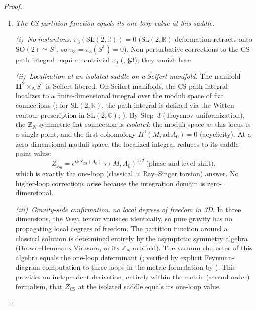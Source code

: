 \begin{proof}
\begin{enumerate}
\item[\emph{5b.}] \emph{The CS partition function equals its
  one-loop value at this saddle.}

  \emph{(i)~No instantons.}
  $\pi_3(\mathrm{SL}(2,\mathbb{R})) = 0$
  ($\mathrm{SL}(2,\mathbb{R})$ deformation-retracts
  onto $\mathrm{SO}(2) \simeq S^1$, so
  $\pi_3 = \pi_3(S^1) = 0$).
  Non-perturbative corrections to the CS path integral
  require nontrivial $\pi_3$
  (\citealt{Witten1989Jones}, \S3);
  they vanish here.

  \emph{(ii)~Localization at an isolated saddle on a
  Seifert manifold.}
  The manifold $\mathbf{H}^2 \times_N S^1$ is Seifert
  fibered.  On Seifert manifolds, the CS path integral
  localizes to a finite-dimensional integral over the
  moduli space of flat connections
  (\citealt{BeasleyWitten2005}; for $\mathrm{SL}(2,\mathbb{R})$,
  the path integral is defined via the Witten contour
  prescription in $\mathrm{SL}(2,\mathbb{C})$;
  \citealt{Witten2010analytic}).
  By Step~3 (Troyanov uniformization), the
  $\mathbb{Z}_N$-symmetric flat connection is
  \emph{isolated}: the moduli space at this locus is
  a single point, and the first cohomology
  $H^1(M;\mathrm{ad}\,A_0) = 0$ (acyclicity).
  At a zero-dimensional moduli space, the
  localized integral reduces to its saddle-point value:
  \[
    Z_{A_0} = e^{ik\,S_{\mathrm{CS}}(A_0)}
    \;\tau(M, A_0)^{1/2}
    \;\text{(phase and level shift)},
  \]
  which is exactly the one-loop (classical $\times$
  Ray--Singer torsion) answer.  No higher-loop
  corrections arise because the integration domain is
  zero-dimensional.

  \emph{(iii)~Gravity-side confirmation: no local
  degrees of freedom in 3D.}
  In three dimensions, the Weyl tensor vanishes
  identically, so pure gravity has no propagating
  local degrees of freedom.  The partition function
  around a classical solution is determined entirely by
  the asymptotic symmetry algebra (Brown--Henneaux
  Virasoro, or its $\mathbb{Z}_N$ orbifold).
  The vacuum character of this algebra equals the
  one-loop determinant
  (\citealt{MaloneyWitten2010};
  verified by explicit Feynman-diagram computation
  to three loops in the metric formulation by
  \citealt{GoyaLestonPassaglia2025}).
  This provides an independent derivation, entirely
  within the metric (second-order) formalism, that
  $Z_{\mathrm{CS}}$ at the isolated saddle equals its
  one-loop value.


\end{enumerate}
\end{proof}
